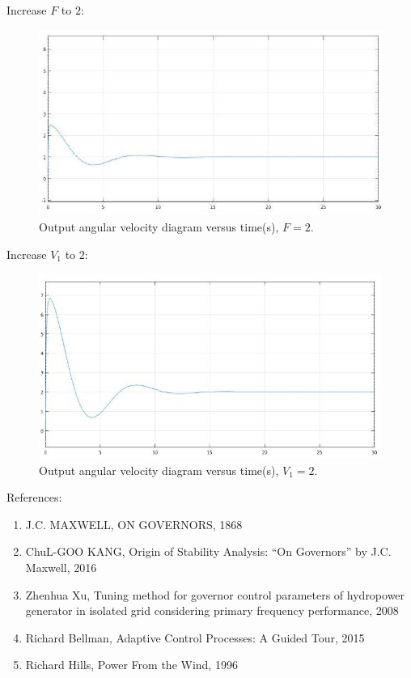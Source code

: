 \documentclass[11pt]{scrartcl} %
\begin{document}
\newline Increase $F$ to $2$:
\begin{figure}[h] 
	\centering
	\includegraphics[width=0.55\columnwidth]{images/p14.jpg}
	\caption{Output angular velocity diagram versus time(s), $F = 2$.}
\end{figure}
\newpage Increase $V_1$ to $2$:
\begin{figure}[h] 
	\centering
	\includegraphics[width=0.55\columnwidth]{images/p15.jpg}
	\caption{Output angular velocity diagram versus time(s), $V_1 = 2$.}
\end{figure}


{\huge References:}
\begin{enumerate}
	\item J.C. MAXWELL, ON GOVERNORS, 1868
	\item ChuL-GOO KANG, Origin of Stability Analysis: “On Governors” by J.C. Maxwell, 2016
	\item Zhenhua Xu, Tuning method for governor control parameters of hydropower generator in isolated grid considering primary frequency performance, 2008
	\item Richard Bellman,  Adaptive Control Processes: A Guided Tour, 2015
	\item Richard Hills, Power From the Wind, 1996
\end{enumerate}
\end{document}

